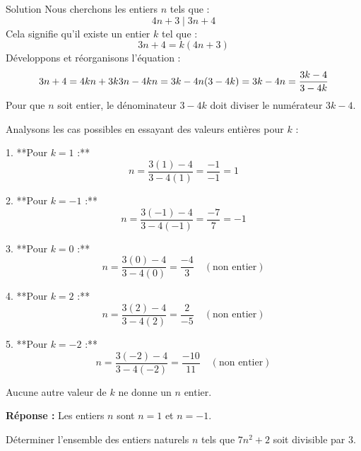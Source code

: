 \documentclass[a4paper,12pt]{article}
\begin{document}
\begin{solutionbox}{Solution}
Nous cherchons les entiers \( n \) tels que :
\[
4n + 3 \mid 3n + 4
\]
Cela signifie qu’il existe un entier \( k \) tel que :
\[
3n + 4 = k(4n + 3)
\]
Développons et réorganisons l’équation :
\[
3n + 4 = 4kn + 3k \\
3n - 4kn = 3k - 4 \\
n(3 - 4k) = 3k - 4 \\
n = \frac{3k - 4}{3 - 4k}
\]
Pour que \( n \) soit entier, le dénominateur \( 3 - 4k \) doit diviser le numérateur \( 3k - 4 \).

Analysons les cas possibles en essayant des valeurs entières pour \( k \) :

1. **Pour \( k = 1 \) :**
   \[
   n = \frac{3(1) - 4}{3 - 4(1)} = \frac{-1}{-1} = 1
   \]
   
2. **Pour \( k = -1 \) :**
   \[
   n = \frac{3(-1) - 4}{3 - 4(-1)} = \frac{-7}{7} = -1
   \]
   
3. **Pour \( k = 0 \) :**
   \[
   n = \frac{3(0) - 4}{3 - 4(0)} = \frac{-4}{3} \quad (\text{non entier})
   \]
   
4. **Pour \( k = 2 \) :**
   \[
   n = \frac{3(2) - 4}{3 - 4(2)} = \frac{2}{-5} \quad (\text{non entier})
   \]
   
5. **Pour \( k = -2 \) :**
   \[
   n = \frac{3(-2) - 4}{3 - 4(-2)} = \frac{-10}{11} \quad (\text{non entier})
   \]
   
Aucune autre valeur de \( k \) ne donne un \( n \) entier.

\textbf{Réponse :} Les entiers \( n \) sont \( n = 1 \) et \( n = -1 \).
\end{solutionbox}

\begin{exercice}[title=Exercice 3 $\quad \star \star \quad$ { [Calculer] }]
Déterminer l’ensemble des entiers naturels \( n \) tels que \( 7n^2 + 2 \) soit divisible par \( 3 \).
\end{exercice}
\end{document}
